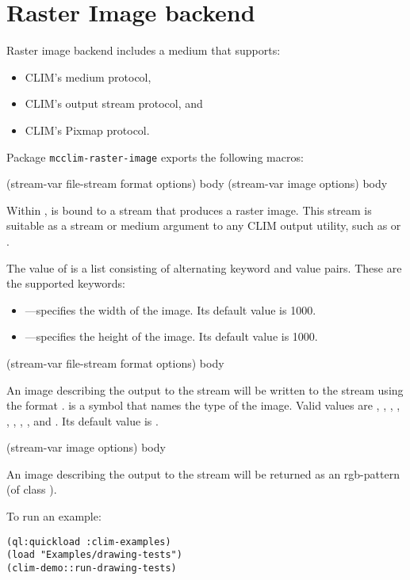 \chapter{Raster Image backend}
Raster image backend includes a medium that supports:
\begin{itemize}
\item CLIM's medium protocol, 
\item CLIM's output stream protocol, and
\item CLIM's Pixmap protocol.
\end{itemize}

Package \texttt{mcclim-raster-image} exports the following macros:

 {(stream-var file-stream format \rest options) \body body}
 {(stream-var image \rest options) \body body}

Within ,  is bound to a stream that produces
a raster image.  This stream is suitable as a stream or medium argument to any
CLIM output utility, such as  or .  

The value of  is a list consisting of alternating keyword and value
pairs.  These are the supported keywords:
\begin{itemize}
\item {}---specifies the width of the image. Its default value is 1000.
\item {}---specifies the height of the image. Its default value is 1000. 
\end{itemize}

 {(stream-var file-stream format \rest options) \body body}

An image describing the output to the  stream will be
written to the stream  using the format
.  is a symbol that names the type of the
image. Valid values are , , , ,
, , , , and . Its default
value is .

 {(stream-var image \rest options) \body body}

An image describing the output to the  stream will be
returned as an rgb-pattern (of class ).


To run an example:
\begin{verbatim}
(ql:quickload :clim-examples)
(load "Examples/drawing-tests")
(clim-demo::run-drawing-tests)
\end{verbatim}




